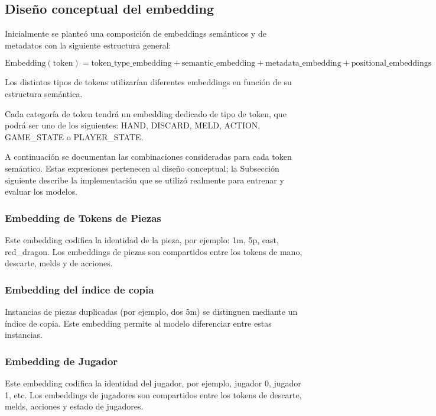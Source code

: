 \subsection{Diseño conceptual del embedding}

Inicialmente se planteó una composición de embeddings semánticos y de metadatos con la siguiente estructura general:

$$\text{Embedding}(\text{token}) = 
\text{token\_type\_embedding} +
\text{semantic\_embedding} +
\text{metadata\_embedding} +
\text{positional\_embeddings} $$

Los distintos tipos de tokens utilizarían diferentes embeddings en función de su estructura semántica.

Cada categoría de token tendrá un embedding dedicado de tipo de token, que podrá ser uno de los siguientes: HAND, DISCARD, MELD, ACTION, GAME\_STATE o PLAYER\_STATE.

A continuación se documentan las combinaciones consideradas para cada token semántico. Estas expresiones pertenecen al diseño conceptual; la Subsección siguiente describe la implementación que se utilizó realmente para entrenar y evaluar los modelos.

\subsubsection{Embedding de Tokens de Piezas}

Este embedding codifica la identidad de la pieza, por ejemplo:
1m, 5p, east, red\_dragon. Los embeddings de piezas son compartidos entre los tokens de mano, descarte, melds y de acciones.

\subsubsection{Embedding del índice de copia}

Instancias de piezas duplicadas (por ejemplo, dos 5m) se distinguen mediante un índice de copia. Este embedding permite al modelo diferenciar entre estas instancias. 

\subsubsection{Embedding de Jugador}

Este embedding codifica la identidad del jugador, por ejemplo, jugador 0, jugador 1, etc. Los embeddings de jugadores son compartidos entre los tokens de descarte, melds, acciones y estado de jugadores.


